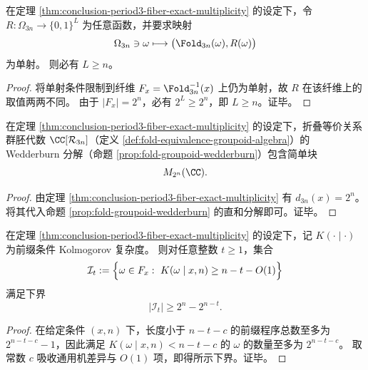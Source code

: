 \begin{proposition}[使折叠注入化所需的外置信息线性下界]\label{prop:conclusion-single-fiber-injectivization-sideinfo-lb}
在定理 \ref{thm:conclusion-period3-fiber-exact-multiplicity} 的设定下，令 \(R:\Omega_{3n}\to\{0,1\}^L\) 为任意函数，并要求映射
\[
\Omega_{3n}\ni\omega\longmapsto \bigl(\Fold_{3n}(\omega),R(\omega)\bigr)
\]
为单射。
则必有 \(L\ge n\)。
\end{proposition}

\begin{proof}
将单射条件限制到纤维 \(F_x=\Fold_{3n}^{-1}(x)\) 上仍为单射，故 \(R\) 在该纤维上的取值两两不同。
由于 \(|F_x|=2^n\)，必有 \(2^L\ge 2^n\)，即 \(L\ge n\)。证毕。
\end{proof}

\begin{corollary}[折叠等价关系群胚代数中的指数级矩阵块]\label{cor:conclusion-single-fiber-wedderburn-big-block}
在定理 \ref{thm:conclusion-period3-fiber-exact-multiplicity} 的设定下，折叠等价关系群胚代数 \(\CC[\mathcal{R}_{3n}]\)（定义 \ref{def:fold-equivalence-groupoid-algebra}）的 Wedderburn 分解（命题 \ref{prop:fold-groupoid-wedderburn}）包含简单块
\[
M_{2^n}(\CC).
\]
\end{corollary}

\begin{proof}
由定理 \ref{thm:conclusion-period3-fiber-exact-multiplicity} 有 \(d_{3n}(x)=2^n\)。
将其代入命题 \ref{prop:fold-groupoid-wedderburn} 的直和分解即可。证毕。
\end{proof}

\begin{proposition}[单一周期纤维内的不可压缩微态计数]\label{prop:conclusion-single-fiber-kolmogorov-incompressible}
在定理 \ref{thm:conclusion-period3-fiber-exact-multiplicity} 的设定下，记 \(K(\cdot\mid\cdot)\) 为前缀条件 Kolmogorov 复杂度。
则对任意整数 \(t\ge 1\)，集合
\[
\mathcal I_t
:=\Bigl\{\omega\in F_x:\ K(\omega\mid x,n)\ge n-t-O(1)\Bigr\}
\]
满足下界
\[
|\mathcal I_t|\ge 2^n-2^{n-t}.
\]
\end{proposition}

\begin{proof}
在给定条件 \((x,n)\) 下，长度小于 \(n-t-c\) 的前缀程序总数至多为 \(2^{n-t-c}-1\)，因此满足
\(
K(\omega\mid x,n)<n-t-c
\)
的 \(\omega\) 的数量至多为 \(2^{n-t-c}\)。
取常数 \(c\) 吸收通用机差异与 \(O(1)\) 项，即得所示下界。证毕。
\end{proof}

\endinput

